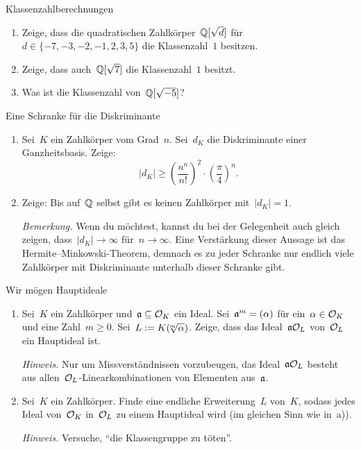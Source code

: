 \documentclass{uebblatt}
\begin{document}

\begin{aufgabe}{Klassenzahlberechnungen}
\begin{enumerate}
\item Zeige, dass die quadratischen Zahlkörper~$\mathbb{Q}[\sqrt{d}]$ für~$d \in \{
-7, -3, -2, -1, 2, 3, 5 \}$ die Klassenzahl~$1$ besitzen.
\item Zeige, dass auch~$\mathbb{Q}[\sqrt{7}]$ die Klassenzahl~$1$ besitzt.
\item Was ist die Klassenzahl von~$\mathbb{Q}[\sqrt{-5}]$?
\end{enumerate}
\end{aufgabe}

\begin{aufgabe}{Eine Schranke für die Diskriminante}
\begin{enumerate}
\item Sei~$K$ ein Zahlkörper vom Grad~$n$. Sei~$d_K$ die Diskriminante einer
Ganzheitsbasis. Zeige:
\[ |d_K| \geq \left(\frac{n^n}{n!}\right)^2 \cdot \left(\frac{\pi}{4}\right)^n. \]
\item Zeige: Bis auf~$\mathbb{Q}$ selbst gibt es keinen Zahlkörper mit~$|d_K| = 1$.

{\tiny\emph{Bemerkung.} Wenn du möchtest, kannst du bei der Gelegenheit auch
gleich zeigen, dass~$|d_K| \to \infty$ für~$n \to \infty$. Eine Verstärkung
dieser Aussage ist das Hermite--Minkowski-Theorem, demnach es zu
jeder Schranke nur endlich viele Zahlkörper mit Diskriminante unterhalb dieser
Schranke gibt.\par}
\end{enumerate}
\end{aufgabe}

\begin{aufgabe}{Wir mögen Hauptideale}
\begin{enumerate}
\item Sei~$K$ ein Zahlkörper und~$\mathfrak{a} \subseteq \mathcal{O}_K$ ein Ideal. Sei~$\mathfrak{a}^m =
(\alpha)$ für ein~$\alpha \in \mathcal{O}_K$ und eine Zahl~$m \geq 0$. Sei~$L \vcentcolon=
K(\!\!\sqrt[m]{\alpha})$. Zeige, dass das Ideal~$\mathfrak{a} \mathcal{O}_L$ von~$\mathcal{O}_L$ ein
Hauptideal ist.

{\tiny\emph{Hinweis.} Nur um Missverständnissen vorzubeugen, das
Ideal~$\mathfrak{a}\mathcal{O}_L$ besteht aus allen~$\mathcal{O}_L$-Linearkombinationen von Elementen
aus~$\mathfrak{a}$.\par}
\item Sei~$K$ ein Zahlkörper. Finde eine endliche Erweiterung~$L$ von~$K$,
sodass jedes Ideal von~$\mathcal{O}_K$ in~$\mathcal{O}_L$ zu einem Hauptideal wird (im gleichen
Sinn wie in~a)).

{\tiny\emph{Hinweis.} Versuche, "`die Klassengruppe zu töten"'.\par}
\end{enumerate}
\end{aufgabe}
\end{document}
